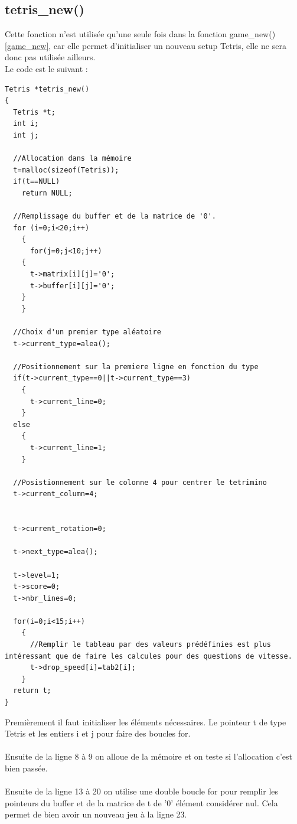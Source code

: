 \documentclass[a4paper,10p]{report}
\begin{document}
\subsection{tetris\_new()}
\label{tetris_new}
Cette fonction n'est utilisée qu'une seule fois dans la fonction game\_new() \ref{game_new}, car elle permet d'initialiser un nouveau setup Tetris, elle ne sera donc pas utilisée ailleurs.
\\Le code est le suivant :
\begin{lstlisting}
Tetris *tetris_new()
{
  Tetris *t;
  int i;
  int j;

  //Allocation dans la mémoire
  t=malloc(sizeof(Tetris));
  if(t==NULL)
    return NULL;

  //Remplissage du buffer et de la matrice de '0'.
  for (i=0;i<20;i++)
    {
      for(j=0;j<10;j++)
	{
	  t->matrix[i][j]='0';
	  t->buffer[i][j]='0';
	}
    }

  //Choix d'un premier type aléatoire
  t->current_type=alea();

  //Positionnement sur la premiere ligne en fonction du type
  if(t->current_type==0||t->current_type==3)
    {
      t->current_line=0;
    }
  else
    {
      t->current_line=1;
    }

  //Posistionnement sur le colonne 4 pour centrer le tetrimino
  t->current_column=4;


  t->current_rotation=0;

  t->next_type=alea();

  t->level=1;
  t->score=0;
  t->nbr_lines=0;

  for(i=0;i<15;i++)
    {
      //Remplir le tableau par des valeurs prédéfinies est plus intéressant que de faire les calcules pour des questions de vitesse.
      t->drop_speed[i]=tab2[i];
    }
  return t;
}
\end{lstlisting}
Premièrement il faut initialiser les éléments nécessaires. Le pointeur t de type Tetris et les entiers i et j pour faire des boucles for.
\\\\
Ensuite de la ligne \textcolor{gris}{8} à \textcolor{gris}{9} on alloue de la mémoire et on teste si l'allocation c'est bien passée.
\\\\
Ensuite de la ligne \textcolor{gris}{13} à \textcolor{gris}{20} on utilise une double boucle for pour remplir les pointeurs du buffer et de la matrice de t de '0' élément considérer nul. Cela permet de bien avoir un nouveau jeu à la ligne \textcolor{gris}{23}.
\\\\
\end{document}
